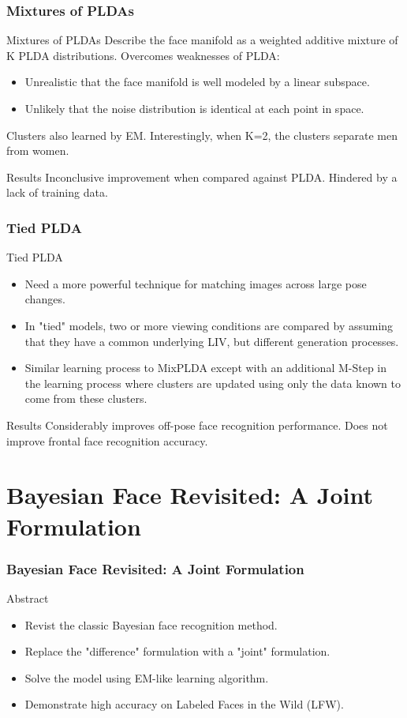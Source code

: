 \documentclass{beamer}
\begin{document}
\begin{frame}
\frametitle{Mixtures of PLDAs}
\begin{block}{Mixtures of PLDAs}
Describe the face manifold as a weighted additive mixture of K PLDA distributions.
\pause
Overcomes weaknesses of PLDA:
\pause
\begin{itemize}
\item Unrealistic that the face manifold is well modeled by a linear subspace.
\pause
\item Unlikely that the noise distribution is identical at each point in space.
\end{itemize}
\pause
Clusters also learned by EM. Interestingly, when K=2, the clusters separate men from women.
\end{block}
\pause
\begin{block}{Results}
Inconclusive improvement when compared against PLDA. Hindered by a lack of training data.
\end{block}
\end{frame}

\begin{frame}
\frametitle{Tied PLDA}
\begin{block}{Tied PLDA}
\begin{itemize}
\item Need a more powerful technique for matching images across large pose changes.
\pause
\item In "tied" models, two or more viewing conditions are compared by assuming that they have a common underlying LIV, but different generation processes.
\pause
\item Similar learning process to MixPLDA except with an additional M-Step in the learning process where clusters are updated using only the data known to come from these clusters.
\end{itemize}
\end{block}
\pause
\begin{block}{Results}
Considerably improves off-pose face recognition performance. Does not improve frontal face recognition accuracy.
\end{block}
\end{frame}

\section{Bayesian Face Revisited: A Joint Formulation}
\begin{frame}
\frametitle{Bayesian Face Revisited: A Joint Formulation}
\begin{block}{Abstract}
\begin{itemize}
\item Revist the classic Bayesian face recognition method.
\pause
\item Replace the "difference" formulation with a "joint" formulation.
\pause
\item Solve the model using EM-like learning algorithm.
\pause
\item Demonstrate high accuracy on Labeled Faces in the Wild (LFW).
\end{itemize}
\end{block}
\end{frame}
\end{document}
